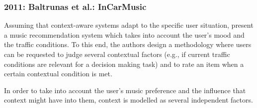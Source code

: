 \subsubsection{2011: Baltrunas et al.: InCarMusic}
\label{sec:baltrunas}

Assuming that context-aware systems adapt to the specific user situation,
\citet{baltrunas_incarmusic_2011} present a music recommendation system which
takes into account the user's mood and the traffic conditions. To this
end, the authors design a methodology where users can be requested to judge several
contextual factors (e.g., if current traffic conditions are relevant for a decision
making task) and to rate an item when a certain contextual condition is met. 

In order to take into account the user's music preference and the influence that
context might have into them, context is modelled as several independent factors.
% 
%   
